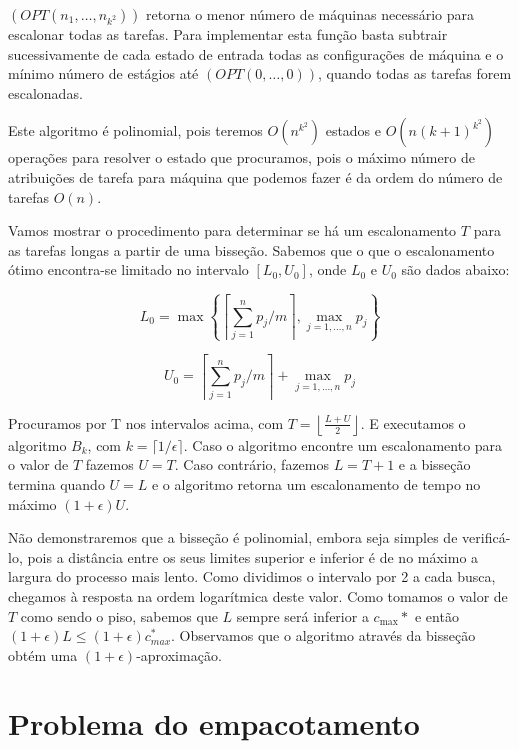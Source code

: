 $(OPT(n_1, \ldots, n_{k^2}))$ retorna o menor número de máquinas necessário para escalonar todas as tarefas. Para implementar esta função basta subtrair sucessivamente de cada estado de entrada todas as configurações de máquina e o mínimo número de estágios até $(OPT(0, \ldots, 0))$, quando todas as tarefas forem escalonadas.

Este algoritmo é polinomial, pois teremos $O(n^{k^2})$ estados e $O(n(k+1)^{k^2})$ operações para resolver o estado que procuramos, pois o máximo número de atribuições de tarefa para máquina que podemos fazer é da ordem do número de tarefas $O(n)$.

Vamos mostrar o procedimento para determinar se há um escalonamento $T$ para as tarefas longas a partir de uma bisseção. Sabemos que o que o escalonamento ótimo encontra-se limitado no intervalo $\left[L_0, U_0\right]$, onde $L_0$ e $U_0$ são dados abaixo:

\begin{equation}
L_0 = \max\left\{\left\lceil \sum_{j=1}^{n} p_j / m \right\rceil, \max_{j=1,\ldots,n} p_j \right\}
\end{equation}

\begin{equation}
U_0 = \left\lceil \sum_{j=1}^{n} p_j / m \right\rceil + \max_{j=1,\ldots,n} p_j 
\end{equation}

Procuramos por T nos intervalos acima, com $T=\left \lfloor \frac{L+U}
{2} \right \rfloor$. E executamos o algoritmo $B_k$, com $k = \lceil 1/ \epsilon \rceil$. Caso o algoritmo encontre um escalonamento para o valor de $T$ fazemos $U=T$. Caso contrário, fazemos $L=T+1$ e a bisseção termina quando $U=L$ e o algoritmo retorna um escalonamento de tempo no máximo $(1+\epsilon)U$. 

Não demonstraremos que a bisseção é polinomial, embora seja simples de verificá-lo, pois a distância entre os seus limites superior e inferior é de no máximo a largura do processo mais lento. Como dividimos o intervalo por 2 a cada busca, chegamos à resposta na ordem logarítmica deste valor. Como tomamos o valor de $T$ como sendo o piso, sabemos que $L$ sempre será inferior a $c_{\max}*$ e então $(1+\epsilon)L \leq (1+\epsilon) c_{max}^*$. Observamos que o algoritmo através da bisseção obtém uma $(1+\epsilon)$-aproximação.

\section{Problema do empacotamento}
\label{sec:empacotamento}

